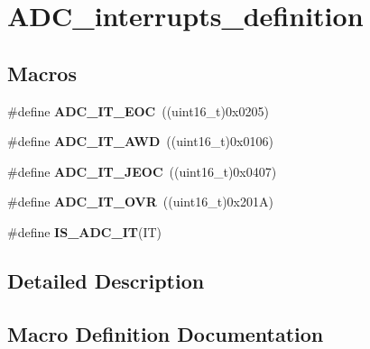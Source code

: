 \hypertarget{group___a_d_c__interrupts__definition}{}\section{A\+D\+C\+\_\+interrupts\+\_\+definition}
\label{group___a_d_c__interrupts__definition}
\subsection*{Macros}
\begin{DoxyCompactItemize}
\item 
\#define {\bfseries A\+D\+C\+\_\+\+I\+T\+\_\+\+E\+OC}~((uint16\+\_\+t)0x0205)\hypertarget{group___a_d_c__interrupts__definition_ga0ad335d835f54415194d448019569e00}{}\label{group___a_d_c__interrupts__definition_ga0ad335d835f54415194d448019569e00}

\item 
\#define {\bfseries A\+D\+C\+\_\+\+I\+T\+\_\+\+A\+WD}~((uint16\+\_\+t)0x0106)\hypertarget{group___a_d_c__interrupts__definition_ga2f5c7f9900c24250a0c6ccaa7cbca946}{}\label{group___a_d_c__interrupts__definition_ga2f5c7f9900c24250a0c6ccaa7cbca946}

\item 
\#define {\bfseries A\+D\+C\+\_\+\+I\+T\+\_\+\+J\+E\+OC}~((uint16\+\_\+t)0x0407)\hypertarget{group___a_d_c__interrupts__definition_gad439fc0cd69706704d47aeabfeddb631}{}\label{group___a_d_c__interrupts__definition_gad439fc0cd69706704d47aeabfeddb631}

\item 
\#define {\bfseries A\+D\+C\+\_\+\+I\+T\+\_\+\+O\+VR}~((uint16\+\_\+t)0x201\+A)\hypertarget{group___a_d_c__interrupts__definition_gac3852b7789860e0ea79b82115ab877a0}{}\label{group___a_d_c__interrupts__definition_gac3852b7789860e0ea79b82115ab877a0}

\item 
\#define {\bfseries I\+S\+\_\+\+A\+D\+C\+\_\+\+IT}(IT)
\end{DoxyCompactItemize}


\subsection{Detailed Description}


\subsection{Macro Definition Documentation}
